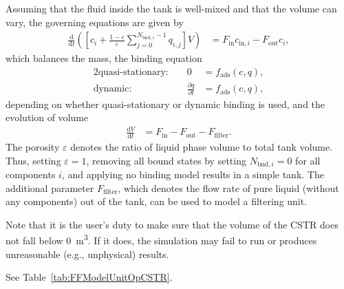 Assuming that the fluid inside the tank is well-mixed and that the volume can vary, the governing equations are given by
\begin{align*}
	\frac{\mathrm{d}}{\mathrm{d}t} \left(\left[ c_i + \frac{1-\varepsilon}{\varepsilon} \sum_{j=0}^{N_{\text{bnd},i} - 1} q_{i,j} \right] V\right) &= F_{\text{in}} c_{\text{in},i} - F_{\text{out}} c_i,
\end{align*}
which balances the mass, the binding equation
\begin{alignat*}{2}
	\text{quasi-stationary: }& & 0 &= f_{\text{ads}}( c, q), \\
	\text{dynamic: }& & \frac{\partial q}{\partial t} &= f_{\text{ads}}( c, q),
\end{alignat*}
depending on whether quasi-stationary or dynamic binding is used, and the evolution of volume
\begin{align*}
	\frac{\mathrm{d}V}{\mathrm{d}t} &= F_{\text{in}} - F_{\text{out}} - F_{\text{filter}}.
\end{align*}
The porosity $\varepsilon$ denotes the ratio of liquid phase volume to total tank volume.
Thus, setting $\varepsilon = 1$, removing all bound states by setting $N_{\text{bnd},i} = 0$ for all components $i$, and applying no binding model results in a simple tank.
The additional parameter $F_{\text{filter}}$, which denotes the flow rate of pure liquid (without any components) out of the tank, can be used to model a filtering unit.

Note that it is the user's duty to make sure that the volume of the CSTR does not fall below \SI{0}{\cubic\metre}.
If it does, the simulation may fail to run or produces unreasonable (e.g., unphysical) results.

See Table~\ref{tab:FFModelUnitOpCSTR}.
